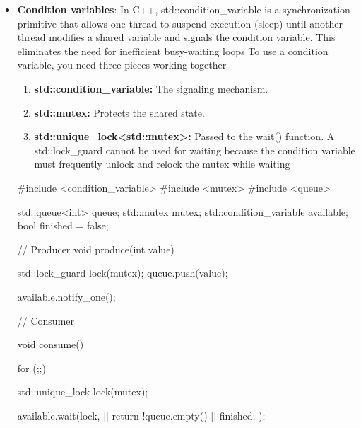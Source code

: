 \documentclass{report}
\begin{document}
\begin{itemize}
\begin{cppcode}
                if (lock.owns_lock()) {
                    use_shared_state();
                }
            \end{cppcode}
        \item \textbf{Condition variables}: In C++, std::condition\_variable is a synchronization primitive that allows one thread to suspend execution (sleep) until another thread modifies a shared variable and signals the condition variable. This eliminates the need for inefficient busy-waiting loops
            \bigbreak \noindent 
            To use a condition variable, you need three pieces working together
            \begin{enumerate}
                \item \textbf{std::condition\_variable:} The signaling mechanism.
                \item \textbf{std::mutex:} Protects the shared state.
                \item \textbf{std::unique\_lock<std::mutex>:} Passed to the wait() function. A std::lock\_guard cannot be used for waiting because the condition variable must frequently unlock and relock the mutex while waiting
            \end{enumerate}
            \bigbreak \noindent 
            \begin{cppcode}
                #include <condition_variable>
                #include <mutex>
                #include <queue>

                std::queue<int> queue;
                std::mutex mutex;
                std::condition_variable available;
                bool finished = false;
            \end{cppcode}
            \bigbreak \noindent 
            \begin{cppcode}
            // Producer
            void produce(int value) {
                {
                    std::lock_guard lock(mutex);
                    queue.push(value);
                }

                available.notify_one();
            }
            \end{cppcode}
            \bigbreak \noindent 
            \begin{cppcode}
            // Consumer

            void consume() {
                for (;;) {
                    std::unique_lock lock(mutex);

                    available.wait(lock, [] {
                        return !queue.empty() || finished;
                    });

}}
\end{cppcode}
\end{itemize}
\end{document}
